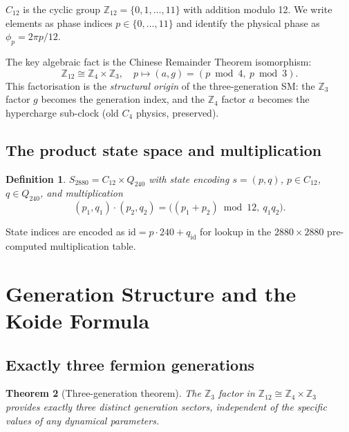 \documentclass[11pt,a4paper]{article}
\newtheorem{theorem}{Theorem}
\newtheorem{definition}[theorem]{Definition}
\theoremstyle{remark}
\begin{document}
$C_{12}$ is the cyclic group $\mathbb{Z}_{12} = \{0, 1, \ldots, 11\}$ with addition
modulo 12.  We write elements as phase indices $p \in \{0, \ldots, 11\}$ and identify
the physical phase as $\phi_p = 2\pi p / 12$.

The key algebraic fact is the Chinese Remainder Theorem isomorphism:
\begin{equation}
  \mathbb{Z}_{12} \cong \mathbb{Z}_4 \times \mathbb{Z}_3 ,
  \quad p \mapsto (a, g) = (p \bmod 4,\ p \bmod 3) .
\label{eq:CRT}
\end{equation}
This factorisation is the \emph{structural origin} of the three-generation SM:
the $\mathbb{Z}_3$ factor $g$ becomes the generation index, and the $\mathbb{Z}_4$ factor
$a$ becomes the hypercharge sub-clock (old $C_4$ physics, preserved).

\subsection{The product state space and multiplication}

\begin{definition}
  $S_{2880} = C_{12} \times Q_{240}$ with state encoding $s = (p, q)$, $p \in C_{12}$,
  $q \in Q_{240}$, and multiplication
  \begin{equation}
    (p_1, q_1) \cdot (p_2, q_2) = \bigl((p_1 + p_2) \bmod 12,\ q_1 q_2\bigr) .
  \label{eq:S2880_mul}
  \end{equation}
\end{definition}

State indices are encoded as $\mathrm{id} = p \cdot 240 + q_{\mathrm{id}}$ for lookup in
the $2880 \times 2880$ pre-computed multiplication table.

\section{Generation Structure and the Koide Formula}
\label{sec:generation}

\subsection{Exactly three fermion generations}

\begin{theorem}[Three-generation theorem]
  The $\mathbb{Z}_3$ factor in $\mathbb{Z}_{12} \cong \mathbb{Z}_4 \times \mathbb{Z}_3$
  provides exactly three distinct generation sectors, independent of the specific values
  of any dynamical parameters.
  \label{thm:generations}
\end{theorem}
\end{document}
